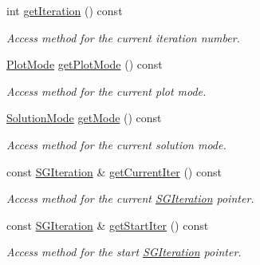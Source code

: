 \begin{DoxyCompactItemize}
int \hyperlink{classSGPlotController_a3feedf398c637ccc61da156098c97f5c}{get\+Iteration} () const
\begin{DoxyCompactList}\small\item\em Access method for the current iteration number. \end{DoxyCompactList}\item 
\mbox{\label{classSGPlotController_a7e98684c6af2fd4c6502cf528c8e4dc5}} 
\hyperlink{classSGPlotController_a04993344b70e1ac27322f54e43f5bce1}{Plot\+Mode} \hyperlink{classSGPlotController_a7e98684c6af2fd4c6502cf528c8e4dc5}{get\+Plot\+Mode} () const
\begin{DoxyCompactList}\small\item\em Access method for the current plot mode. \end{DoxyCompactList}\item 
\mbox{\label{classSGPlotController_a7dcba17b7cb912f96da1965a669127fe}} 
\hyperlink{classSGPlotController_a7b1cebc57af82edfcbd1d2841ffad95c}{Solution\+Mode} \hyperlink{classSGPlotController_a7dcba17b7cb912f96da1965a669127fe}{get\+Mode} () const
\begin{DoxyCompactList}\small\item\em Access method for the current solution mode. \end{DoxyCompactList}\item 
\mbox{\label{classSGPlotController_a857f9b6260f024bad00e68a5cc0e8edd}} 
const \hyperlink{classSGIteration}{S\+G\+Iteration} \& \hyperlink{classSGPlotController_a857f9b6260f024bad00e68a5cc0e8edd}{get\+Current\+Iter} () const
\begin{DoxyCompactList}\small\item\em Access method for the current \hyperlink{classSGIteration}{S\+G\+Iteration} pointer. \end{DoxyCompactList}\item 
\mbox{\label{classSGPlotController_a47600a28556e4701cc94d0c5e54a438f}} 
const \hyperlink{classSGIteration}{S\+G\+Iteration} \& \hyperlink{classSGPlotController_a47600a28556e4701cc94d0c5e54a438f}{get\+Start\+Iter} () const
\begin{DoxyCompactList}\small\item\em Access method for the start \hyperlink{classSGIteration}{S\+G\+Iteration} pointer. \end{DoxyCompactList}\item 

\end{DoxyCompactItemize}
